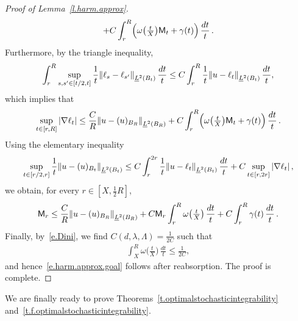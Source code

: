 \documentclass[11pt]{article} %
\numberwithin{equation}{section}
\theoremstyle{definition}
\let\originalleft\left
\let\originalright\right
\renewcommand{\left}{\mathopen{}\mathclose\bgroup\originalleft}
\renewcommand{\right}{\aftergroup\egroup\originalright}
\begin{document}
\begin{proof}[{Proof of Lemma~\ref{l.harm.approx}}]
\begin{equation*}
+ C \int_{ r}^{R}  \Bigl( \omega\bigl( \tfrac{t}X \bigr)  \mathsf{M}_t  + \gamma(t) \Bigr) \, \frac{dt}{t} 
\,.
\end{equation*}
Furthermore, by the triangle inequality,  
\begin{equation*}  
\int_{r}^{R} 
\sup_{s,s' \in [t/2,t]}  \frac1t \left\| \ell_{s} -  \ell_{s'} \right\|_{\underline{L}^2 \left( B_{ t} \right)} \, \frac{dt}{t} 
\leq 
C \int_{r}^{R} 
\frac1{t} \left\| u - \ell_{t} \right\|_{\underline{L}^2 \left( B_{ t} \right)} \, \frac{dt}{t} 
,
\end{equation*}
which implies that 
\begin{equation*}  
\sup_{t \in [r,R]} |\nabla \ell_{t}| 
\leq 
\frac CR \left\| u- (u)_{B_R} \right\|_{\underline{L}^2 \left( B_{R} \right)}   
+ C \int_{ r}^{R}  \Bigl(  \omega\bigl( \tfrac{t}X \bigr) \mathsf{M}_t  + \gamma(t) \Bigr)  \, \frac{dt}{t}
\,.
\end{equation*}
Using the elementary inequality
\begin{equation*}  
\sup_{t \in [r/2,r] } \frac1{t} \left\| u - (u)_{B_t} \right\|_{\underline{L}^2 \left( B_{ t} \right)} 
\leq C \int_{r}^{2r} \frac1{t} \left\| u - \ell_{t} \right\|_{\underline{L}^2 \left( B_{ t} \right)} \, \frac{dt}{t} 
+ C \sup_{t \in [r,2r]} |\nabla \ell_{t}|  
\,,
\end{equation*}
we obtain, for every $r \in [X,\tfrac12 R]$, 
\begin{align*}  
\mathsf{M}_r  \leq \frac CR \left\| u- (u)_{B_R} \right\|_{\underline{L}^2 \left( B_{R} \right)}   
+ C \mathsf{M}_r  \int_{ r}^{R}  \omega\bigl( \tfrac{t}X \bigr)  \, \frac{dt}{t}  + C \int_{ r}^{R}  \gamma(t)  \, \frac{dt}{t} 
\,.
\end{align*}
Finally, by~\eqref{e.Dini}, we find $C(d,\lambda,\Lambda) = \frac1{2C}$ such that 
\begin{align*}  
\int_{X}^{R}  \omega\bigl( \tfrac{t}X \bigr)  \, \frac{dt}{t} \leq \frac1{2C},
\end{align*}
and hence~\eqref{e.harm.approx.goal} follows after reabsorption. The proof is complete. 
\end{proof}

We are finally ready to prove Theorems~\ref{t.optimalstochasticintegrability} and~\ref{t.f.optimalstochasticintegrability}. 
\end{document}
